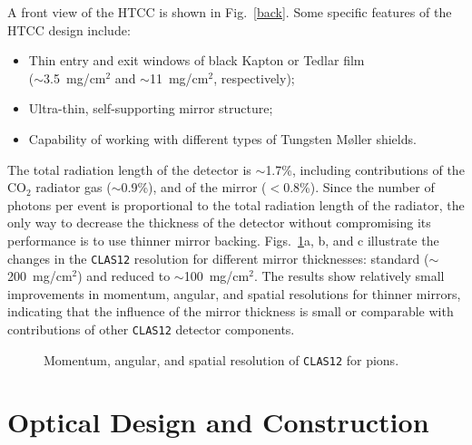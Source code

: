 A front view of the HTCC is shown in Fig.~\ref{back}.  Some specific 
features of the HTCC design include:

\begin{itemize}
\item Thin entry and exit windows of black Kapton or Tedlar film\\ 
($\sim$3.5~mg/cm$^2$ and $\sim$11~mg/cm$^2$, respectively);
\item Ultra-thin, self-supporting mirror structure;
\item Capability of working with different types of Tungsten M{\o}ller 
shields. 
\end{itemize}

The total radiation length of the detector is $\sim$1.7\%, including 
contributions of the CO$_2$ radiator gas ($\sim$0.9\%), and of the mirror 
($<0.8$\%). Since the number of photons per event is proportional to the 
total radiation length of the radiator, the only way to decrease the 
thickness of the detector without compromising its performance is to use 
thinner mirror backing.  Figs.~\ref{resolution}a, b, and c illustrate the 
changes in the {\tt CLAS12} resolution for different mirror thicknesses: 
standard ($\sim$200~mg/cm$^2$) and reduced to $\sim$100~mg/cm$^2$.  The 
results show relatively small improvements in momentum, angular, and spatial 
resolutions for thinner mirrors, indicating that the influence of the mirror 
thickness is small or comparable with contributions of other {\tt CLAS12} 
detector components.

\begin{figure}
\begin{center}
\vspace{0.5in}
\vspace{0.5in}
\vspace{0.5in}
\caption{\small{Momentum, angular, and spatial resolution of {\tt CLAS12} 
for pions.}}
\label{resolution}
\end{center}
\end{figure} 

\section{Optical Design and Construction}
\label{Details}

